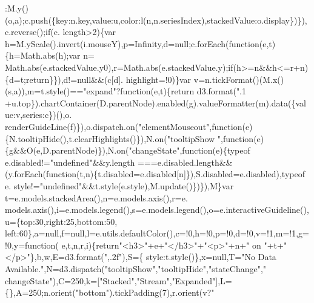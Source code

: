 \begin{DoxyCode}
{{      :M.y()(o,a);c.push(\{key:n.key,value:u,color:l(n,n.seriesIndex),stackedValue:o.display\})\}),c.reverse();\textcolor{keywordflow}{if}(c.
      length>2)\{var h=M.yScale().invert(i.mouseY),p=Infinity,d=null;c.forEach(\textcolor{keyword}{function}(e,t)\{h=Math.abs(h);var n=
      Math.abs(e.stackedValue.y0),r=Math.abs(e.stackedValue.y);\textcolor{keywordflow}{if}(h>=n&&h<=r+n)\{d=t;\textcolor{keywordflow}{return}\}\}),d!=null&&(c[d].
      highlight=!0)\}var v=n.tickFormat()(M.x()(s,a)),m=t.style()==\textcolor{stringliteral}{"expand"}?\textcolor{keyword}{function}(e,t)\{\textcolor{keywordflow}{return} 
      d3.format(\textcolor{stringliteral}{".1%
      +u.top\}).chartContainer(D.parentNode).enabled(g).valueFormatter(m).data(\{value:v,series:c\})(),o.
      renderGuideLine(f)\}),o.dispatch.on(\textcolor{stringliteral}{"elementMouseout"},\textcolor{keyword}{function}(e)\{N.tooltipHide(),t.clearHighlights()\}),N.on(\textcolor{stringliteral}{"tooltipShow
      "},\textcolor{keyword}{function}(e)\{g&&O(e,D.parentNode)\}),N.on(\textcolor{stringliteral}{"changeState"},\textcolor{keyword}{function}(e)\{typeof e.disabled!=\textcolor{stringliteral}{"undefined"}&&y.length
      ===e.disabled.length&&(y.forEach(function(t,n)\{t.disabled=e.disabled[n]\}),S.disabled=e.disabled),typeof e.
      style!=\textcolor{stringliteral}{"undefined"}&&t.style(e.style),M.update()\})\}),M\}var t=e.models.stackedArea(),n=e.models.axis(),r=e.
      models.axis(),i=e.models.legend(),s=e.models.legend(),o=e.interactiveGuideline(),u=\{top:30,right:25,bottom:50,
      left:60\},a=null,f=null,l=e.utils.defaultColor(),c=!0,h=!0,p=!0,d=!0,v=!1,m=!1,g=!0,y=\textcolor{keyword}{function}(
      e,t,n,r,i)\{\textcolor{keywordflow}{return}\textcolor{stringliteral}{"<h3>"}+e+\textcolor{stringliteral}{"</h3>"}+\textcolor{stringliteral}{"<p>"}+n+\textcolor{stringliteral}{" on "}+t+\textcolor{stringliteral}{"</p>"}\},b,w,E=d3.format(\textcolor{stringliteral}{",.2f"}),S=\{
      style:t.style()\},x=null,T=\textcolor{stringliteral}{"No Data Available."},N=d3.dispatch(\textcolor{stringliteral}{"tooltipShow"},\textcolor{stringliteral}{"tooltipHide"},\textcolor{stringliteral}{"stateChange"},\textcolor{stringliteral}{"
      changeState"}),C=250,k=[\textcolor{stringliteral}{"Stacked"},\textcolor{stringliteral}{"Stream"},\textcolor{stringliteral}{"Expanded"}],L=\{\},A=250;n.orient(\textcolor{stringliteral}{"bottom"}).tickPadding(7),r.orient(v?\textcolor{stringliteral}{"
}}}}
\end{DoxyCode}
